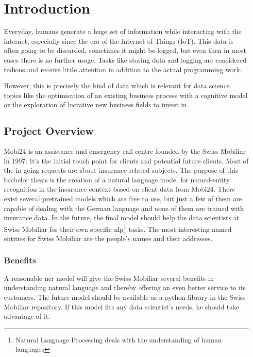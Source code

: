 \chapter{Introduction}

Everyday, humans generate a huge set of information while interacting with the internet, especially since the era of the
Internet of Things (IoT). This data is often going to be discarded, sometimes it might be logged, but even then in most
cases there is no further usage. Tasks like storing data and logging are considered tedious and receive little attention
in addition to the actual programming work.

However, this is precisely the kind of data which is relevant for data science topics like the optimisation of an existing
business process with a cognitive model or the exploration of lucrative new business fields to invest in.

\section{Project Overview}

Mobi24 is an assistance and emergency call centre founded by the Swiss Mobiliar in 1997. It's the initial touch point for
clients and potential future clients. Most of the in-going requests are about insurance related subjects. The purpose of
this bachelor thesis is the creation of a natural language model for named-entity recognition in the insurance context
based on client data from Mobi24. There exist several pretrained models which are free to use, but just a few of them are
capable of dealing with the German language and none of them are trained with insurance data. In the future, the final model
should help the data scientists at Swiss Mobiliar for their own specific \acrshort{nlp}\footnote{Natural Language Processing deals
with the understanding of human languages} tasks. The most interesting named entities for Swiss Mobiliar are the people's names
and their addresses.

\subsection{Benefits}

A reasonable \acrshort{ner} model will give the Swiss Mobiliar several benefits in understanding natural language and thereby
offering an even better service to its customers. The future model should be available as a python library in the Swiss Mobiliar
repository. If this model fits any data scientist's needs, he should take advantage of it.

